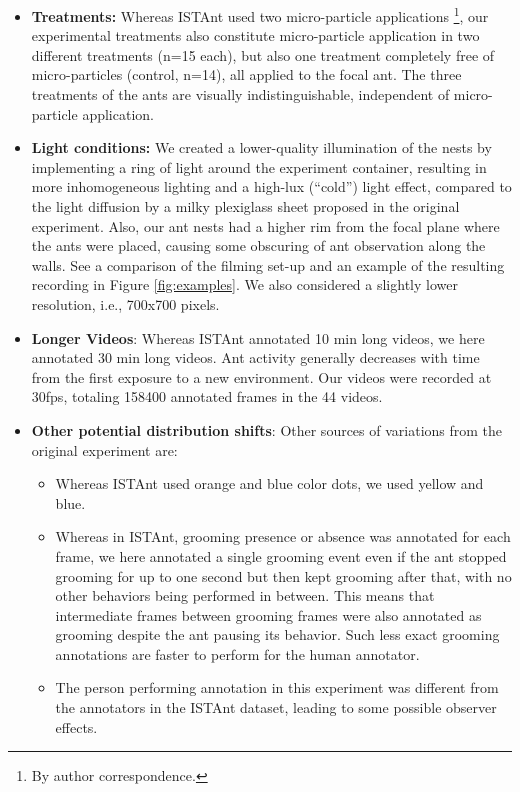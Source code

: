 \begin{itemize}
    \item \textbf{Treatments:} Whereas ISTAnt used two micro-particle applications \footnote{By author correspondence.}, our experimental treatments also constitute micro-particle application in two different treatments (n=15 each), but also one treatment completely free of micro-particles (control, n=14), all applied to the focal ant. The three treatments of the ants are visually indistinguishable, independent of micro-particle application.
    \item \textbf{Light conditions:} We created a lower-quality illumination of the nests by implementing a ring of light around the experiment container, resulting in more inhomogeneous lighting and a high-lux (“cold”) light effect, compared to the light diffusion by a milky plexiglass sheet proposed in the original experiment. Also, our ant nests had a higher rim from the focal plane where the ants were placed, causing some obscuring of ant observation along the walls. See a comparison of the filming set-up and an example of the resulting recording in Figure \ref{fig:examples}. We also considered a slightly lower resolution, i.e., 700x700 pixels.
    \item \textbf{Longer Videos}: Whereas ISTAnt annotated 10 min long videos, we here annotated 30 min long videos. Ant activity generally decreases with time from the first exposure to a new environment. Our videos were recorded at 30fps, totaling 158400 annotated frames in the 44 videos.
    \item \textbf{Other potential distribution shifts}: Other sources of variations from the original experiment are:
    \begin{itemize}
        \item Whereas ISTAnt used orange and blue color dots, we used yellow and blue.
        \item Whereas in ISTAnt, grooming presence or absence was annotated for each frame, we here annotated a single grooming event even if the ant stopped grooming for up to one second but then kept grooming after that, with no other behaviors being performed in between. This means that intermediate frames between grooming frames were also annotated as grooming despite the ant pausing its behavior. Such less exact grooming annotations are faster to perform for the human annotator.
        \item The person performing annotation in this experiment was different from the annotators in the ISTAnt dataset, leading to some possible observer effects. 
    \end{itemize}
\end{itemize}


